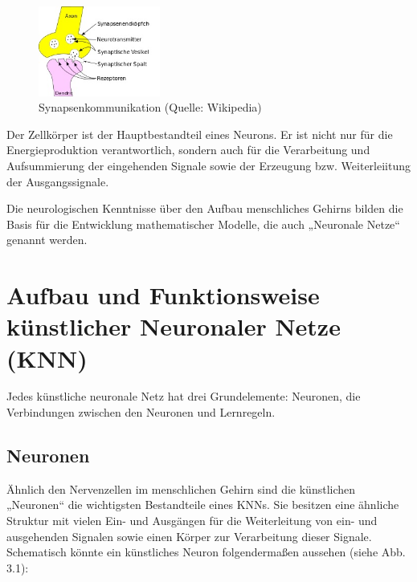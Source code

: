 \begin{figure}[h]
\centering
\includegraphics[width=4cm]{chapters/neural_networks/synapsen.jpg}

\caption{Synapsenkommunikation (Quelle: Wikipedia)}
	\label{img:synapsen}

\end{figure}

Der Zellkörper ist der Hauptbestandteil eines Neurons. Er ist nicht nur für die Energieproduktion verantwortlich, sondern auch für die Verarbeitung und Aufsummierung der eingehenden Signale sowie der Erzeugung bzw. Weiterleiitung der Ausgangssignale.

Die neurologischen Kenntnisse über den Aufbau menschliches Gehirns bilden die Basis für die Entwicklung mathematischer Modelle, die auch „Neuronale Netze“ genannt werden.



\section{Aufbau und Funktionsweise künstlicher  Neuronaler Netze (KNN)}


Jedes künstliche neuronale Netz hat drei Grundelemente: Neuronen, die Verbindungen zwischen den Neuronen und Lernregeln.

\subsection{Neuronen}

Ähnlich den Nervenzellen im menschlichen Gehirn sind die künstlichen „Neuronen“ die wichtigsten Bestandteile eines KNNs. Sie besitzen eine ähnliche Struktur mit vielen Ein- und Ausgängen für die Weiterleitung von ein- und ausgehenden Signalen sowie einen Körper zur Verarbeitung dieser Signale. Schematisch könnte ein künstliches Neuron folgendermaßen aussehen (siehe Abb. 3.1):

